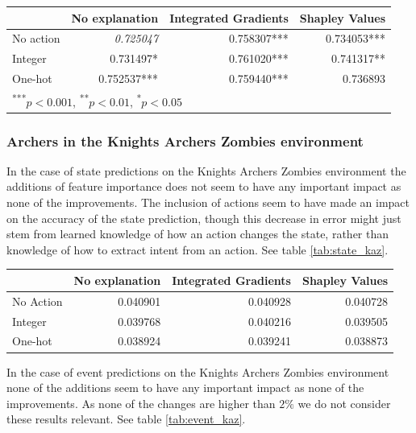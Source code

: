 \documentclass[UKenglish]{uiomasterthesis}
\begin{document}
\begin{center}
\label{tab:event_simpl_trunc}
\begin{tabular}{lrrr}
\toprule
 & No explanation & Integrated Gradients & Shapley Values \\
 \midrule
No action & \textit{0.725047} & 0.758307*** & 0.734053*** \\
Integer & 0.731497* & 0.761020*** & 0.741317** \\
One-hot & 0.752537*** & 0.759440*** & 0.736893 \\
\bottomrule
\multicolumn{3}{l}{\textsuperscript{***}$p<0.001$, 
  \textsuperscript{**}$p<0.01$, 
  \textsuperscript{*}$p<0.05$}
\end{tabular}
\end{center}


\subsubsection{Archers in the Knights Archers Zombies environment}
In the case of state predictions on the Knights Archers Zombies environment the additions of feature importance does not seem to have any important impact as none of the improvements. The inclusion of actions seem to have made an impact on the accuracy of the state prediction, though this decrease in error might just stem from learned knowledge of how an action changes the state, rather than knowledge of how to extract intent from an action. See table \ref{tab:state_kaz}.

\begin{center}
\label{tab:state_kaz}
\begin{tabular}{lrrr}
\toprule
 & No explanation & Integrated Gradients & Shapley Values \\
\midrule
No Action & 0.040901 & 0.040928 & 0.040728 \\
Integer & 0.039768 & 0.040216 & 0.039505 \\
One-hot & 0.038924 & 0.039241 & 0.038873 \\
\bottomrule
\end{tabular}
\end{center}

In the case of event predictions on the Knights Archers Zombies environment none of the additions seem to have any important impact as none of the improvements. As none of the changes are higher than $2\%$ we do not consider these results relevant. See table \ref{tab:event_kaz}.
\end{document}
